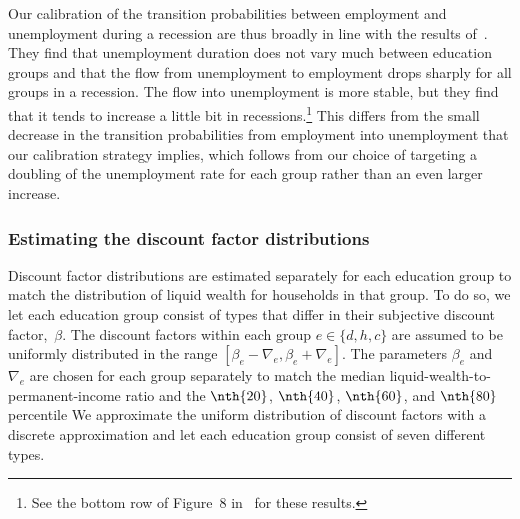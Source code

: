 \documentclass[\latexroot/\projectname]{subfiles}
\begin{document}
Our calibration of the transition probabilities between employment and unemployment during a recession are thus broadly in line with the results of~\cite{elsby2010labor}. They find that unemployment duration does not vary much between education groups and that the flow from unemployment to employment drops sharply for all groups in a recession. The flow into unemployment is more stable, but they find that it tends to increase a little bit in recessions.\footnote{See the bottom row of Figure~8 in~\cite{elsby2010labor} for these results.} This differs from the small decrease in the transition probabilities from employment into unemployment that our calibration strategy implies, which follows from our choice of targeting a doubling of the unemployment rate for each group rather than an even larger increase.



\subsubsection{Estimating the discount factor distributions}
\whenintegrated{\label{sec:estimBetas}}

Discount factor distributions are estimated separately for each education group to match the distribution of liquid wealth for households in that group.
To do so, we let each education group consist of types that differ in their subjective discount factor,~$\beta$.
The discount factors within each group $e\in \{d, h, c\}$ are assumed to be uniformly distributed in the range $[\beta_e-\nabla_e, \beta_e+\nabla_e]$.
The parameters $\beta_e$ and $\nabla_e$ are chosen for each group separately to match the median liquid-wealth-to-permanent-income ratio and the $\nth{20}$, $\nth{40}$, $\nth{60}$, and $\nth{80}$ percentile 
We approximate the uniform distribution of discount factors with a discrete approximation and let each education group consist of seven different types.
\end{document}
